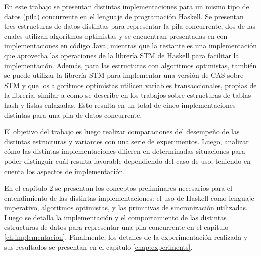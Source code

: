 En este trabajo se presentan distintas implementaciones para un mismo tipo de datos (pila) concurrente en el lenguaje de programación Haskell. Se presentan tres estructuras de datos distintas para representar la pila concurrente, dos de las cuales utilizan algoritmos optimistas y se encuentran presentadas en \cite{shavit} con implementaciones en código Java, mientras que la restante es una implementación que aprovecha las operaciones de la librería STM de Haskell para facilitar la implementación.
Además, para las estructuras con algoritmos optimistas, también se puede utilizar la librería STM para implementar una versión de CAS sobre STM y que los algoritmos optimistas utilicen variables transaccionales, propias de la librería, similar a como se describe en los trabajos \cite{hash} \cite{linked-list} sobre estructuras de tablas hash y listas enlazadas.
Esto resulta en un total de cinco implementaciones distintas para una pila de datos concurrente.

El objetivo del trabajo es luego realizar comparaciones del desempeño de las distintas estructuras y variantes con una serie de experimentos. Luego, analizar cómo las distintas implementaciones difieren en determinadas situaciones para poder distinguir cuál resulta favorable dependiendo del caso de uso, teniendo en cuenta los aspectos de implementación.

En el capítulo 2 se presentan los conceptos preliminares necesarios para el entendimiento de las distintas implementaciones: el uso de Haskell como lenguaje imperativo, algoritmos optimistas, y las primitivas de sincronización utilizadas.
Luego se detalla la implementación y el comportamiento de las distintas estructuras de datos para representar una pila concurrente en el capítulo \ref{ch:implementacion}. Finalmente, los detalles de la experimentación realizada y sus resultados se presentan en el capítulo \ref{chap:experiments}.